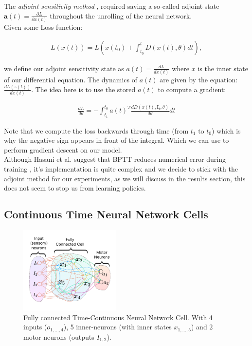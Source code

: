 The \textit{adjoint sensitivity method} \cite{Chen2018NeuralOD}, required saving a so-called adjoint state $\bm{a}(t) = \frac{\partial L}{\partial x(t)}$ throughout the unrolling of the neural network. \\

Given some Loss function:

\begin{align*}
    L(x(t))=L\left( x(t_0)+\int_{t_0}^{t} D(x(t),\theta) dt \right),
\end{align*}

we define our adjoint sensitivity state as $a(t) = \frac{d L}{d x(t)}$ where $x$ is the inner state of our differential equation. The dynamics of $a(t)$ are given by the equation: $\frac{d L(z(t))}{d x(t)}$. The idea here is to use the stored $a(t)$ to compute a gradient: 


\begin{align*}
    \frac{d L}{d \theta} = - \int_{t_1}^{t_0} a(t)^T \frac{d D(x(t), \bm{I}_t, \theta)}{d \theta} dt 
\end{align*}

Note that we compute the loss backwards through time (from $t_1$ to $t_0$) which is why the negative sign appears in front of the integral. Which we can use to perform gradient descent on our model. \\

Although Hasani et al. suggest that BPTT reduces numerical error during training \cite{Hasani2021LiquidTN}, it's implementation is quite complex and we decide to stick with the adjoint method for our experiments, as we will discuss in the results section, this does not seem to stop us from learning policies.

\subsection{Continuous Time Neural Network Cells}
\label{sec:nn_cell}

\begin{figure}[h!]
    \centering
    \includegraphics[width=0.45\textwidth]{figures/LTC_Cell.pdf}
    \caption{Fully connected Time-Continuous Neural Network Cell. With 4 inputs ($o_{1,\dots,4}$), 5 inner-neurons (with inner states $x_{1,\dots,5}$) and 2 motor neurons (outputs $I_{1,2}$).}
    \label{fig:cell_drawing}
\end{figure}


